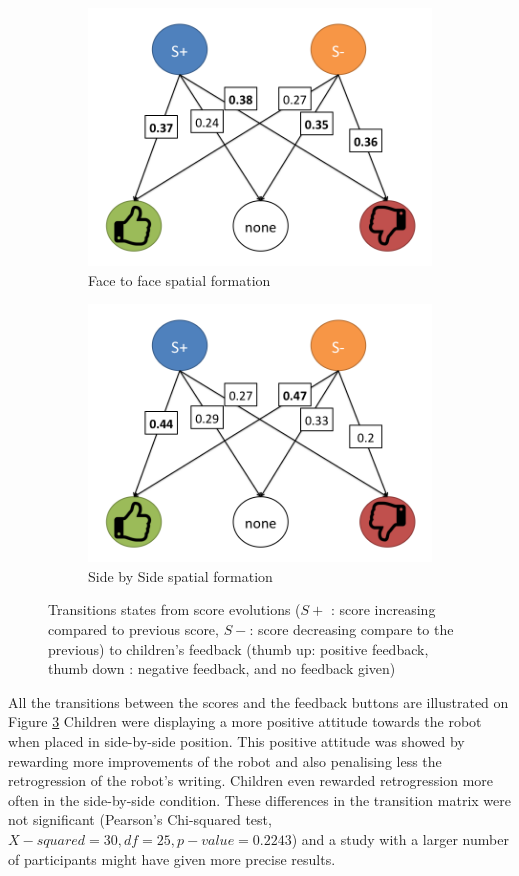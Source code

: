 \documentclass[letterpaper, 10 pt, conference]{ieeeconf}  %
\begin{document}
\begin{figure}
	\centering
	\begin{subfigure}{0.5\textwidth}
		\centering
		\includegraphics[width=0.8\linewidth]{./figures/states/states_f2f}
		\caption{Face to face spatial formation}
		\label{fig:f2fstate}
	\end{subfigure}%
	\begin{subfigure}{0.5\textwidth}
		\centering
		\includegraphics[width=0.8\linewidth]{./figures/states/statess_sbs}
		\caption{Side by Side spatial formation}
		\label{fig:sbsstate}
	\end{subfigure}
	\caption{Transitions states from score evolutions ($S+$ : score increasing compared to previous score, $S-$: score decreasing compare to the previous) to children's feedback (thumb up: positive feedback, thumb down : negative feedback, and no feedback given)}
	\label{fig:state}
\end{figure}

All the transitions between the scores and the feedback buttons are illustrated on Figure \ref{fig:state}
Children were displaying a more positive attitude towards the robot when placed in side-by-side position.
This positive attitude was showed by rewarding more improvements of the robot and also penalising less the retrogression of the robot's writing.
Children even rewarded retrogression more often in the side-by-side condition.
These differences in the transition matrix were not significant (Pearson's Chi-squared test, $X-squared = 30, df = 25, p-value = 0.2243$) and a study with a larger number of participants might have given more precise results.
\end{document}
